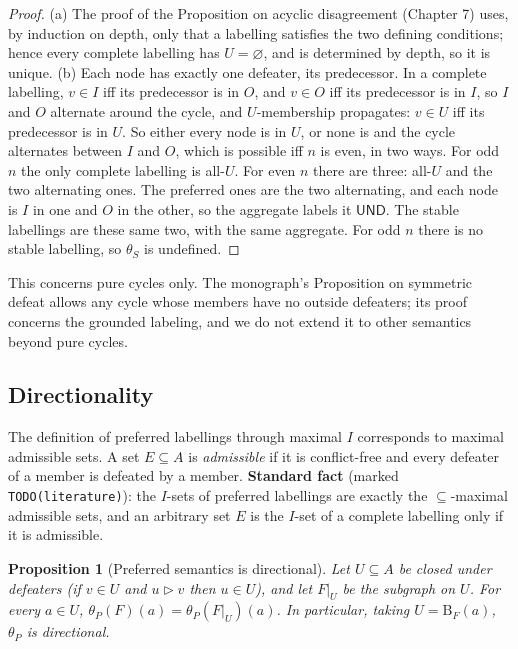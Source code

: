 \documentclass[11pt]{article}
\theoremstyle{plain}
\newtheorem{proposition}[theorem]{Proposition}
\theoremstyle{definition}
\theoremstyle{remark}
\newcommand{\UND}{\textsf{UND}}
\newcommand{\dfeat}{\rhd}
\newcommand{\Bc}{\mathrm{B}}
\begin{document}
\begin{proof}
(a) The proof of the Proposition on acyclic disagreement (Chapter 7) uses, by induction on depth, only that a labelling satisfies the two defining conditions; hence every complete labelling has $U=\varnothing$, and is determined by depth, so it is unique. (b) Each node has exactly one defeater, its predecessor. In a complete labelling, $v\in I$ iff its predecessor is in $O$, and $v\in O$ iff its predecessor is in $I$, so $I$ and $O$ alternate around the cycle, and $U$-membership propagates: $v\in U$ iff its predecessor is in $U$. So either every node is in $U$, or none is and the cycle alternates between $I$ and $O$, which is possible iff $n$ is even, in two ways. For odd $n$ the only complete labelling is all-$U$. For even $n$ there are three: all-$U$ and the two alternating ones. The preferred ones are the two alternating, and each node is $I$ in one and $O$ in the other, so the aggregate labels it $\UND$. The stable labellings are these same two, with the same aggregate. For odd $n$ there is no stable labelling, so $\theta_S$ is undefined. \qedhere
\end{proof}

This concerns pure cycles only. The monograph's Proposition on symmetric defeat allows any cycle whose members have no outside defeaters; its proof concerns the grounded labeling, and we do not extend it to other semantics beyond pure cycles.

\subsection{Directionality}

The definition of preferred labellings through maximal $I$ corresponds to maximal admissible sets. A set $E\subseteq A$ is \emph{admissible} if it is conflict-free and every defeater of a member is defeated by a member. \textbf{Standard fact} (marked \verb|TODO(literature)|): the $I$-sets of preferred labellings are exactly the $\subseteq$-maximal admissible sets, and an arbitrary set $E$ is the $I$-set of a complete labelling only if it is admissible. %

\begin{proposition}[Preferred semantics is directional]\label{prop:prefdir}
Let $U\subseteq A$ be closed under defeaters (if $v\in U$ and $u\dfeat v$ then $u\in U$), and let $F|_U$ be the subgraph on $U$. For every $a\in U$, $\theta_P(F)(a)=\theta_P(F|_U)(a)$. In particular, taking $U=\Bc_F(a)$, $\theta_P$ is directional.
\end{proposition}
\end{document}
